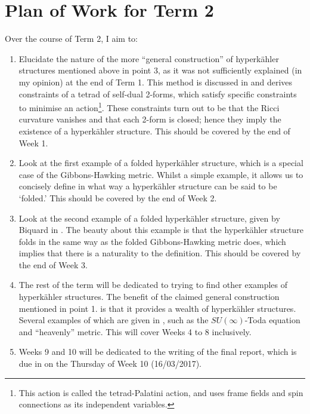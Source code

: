 \documentclass[a4paper,onecolumn,12pt]{article}
\theoremstyle{definition}
\theoremstyle{remark}
\newcommand{\HK}{hyperk\"ahler }
\begin{document}
\section{Plan of Work for Term 2}
Over the course of Term 2, I aim to:
\begin{enumerate}
	\item Elucidate the nature of the more ``general construction'' of \HK structures mentioned above in point 3, as it was not sufficiently explained (in my opinion) at the end of Term 1. This method is discussed in \cite{capovilla_1991, jacobson_1988} and derives constraints of a tetrad of self-dual 2-forms, which satisfy specific constraints to minimise an action\footnote{This action is called the tetrad-Palatini action, and uses frame fields and spin connections as its independent variables.}. These constraints turn out to be that the Ricci curvature vanishes and that each 2-form is closed; hence they imply the existence of a \HK structure. This should be covered by the end of Week 1.
	\item Look at the first example of a folded \HK structure, which is a special case of the Gibbons-Hawking metric. Whilst a simple example, it allows us to concisely define in what way a \HK structure can be said to be `folded.' This should be covered by the end of Week 2.
	\item Look at the second example of a folded \HK structure, given by Biquard in \cite{biquard_2015}. The beauty about this example is that the \HK structure folds in the same way as the folded Gibbons-Hawking metric does, which implies that there is a naturality to the definition. This should be covered by the end of Week 3.
	\item The rest of the term will be dedicated to trying to find other examples of \HK structures. The benefit of the claimed general construction mentioned in point 1. is that it provides a wealth of \HK structures. Several examples of which are given in \cite{hashimoto_1997}, such as the $SU(\infty)$-Toda equation and ``heavenly'' metric. This will cover Weeks 4 to 8 inclusively.
	\item Weeks 9 and 10 will be dedicated to the writing of the final report, which is due in on the Thursday of Week 10 (16/03/2017).
\end{enumerate}

 

\end{document}
